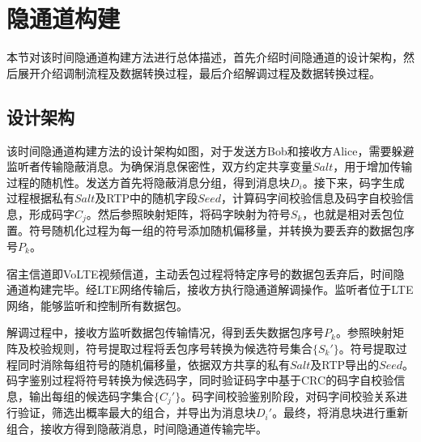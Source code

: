 \section{隐通道构建}
\label{chap:hash:designation}

本节对该时间隐通道构建方法进行总体描述，首先介绍时间隐通道的设计架构，然后展开介绍调制流程及数据转换过程，最后介绍解调过程及数据转换过程。

\subsection{设计架构}
\label{chap:hash:designation:model}


该时间隐通道构建方法的设计架构如图，对于发送方Bob和接收方Alice，需要躲避监听者传输隐蔽消息。为确保消息保密性，双方约定共享变量$Salt$，用于增加传输过程的随机性。发送方首先将隐蔽消息分组，得到消息块$D_{i}$。接下来，码字生成过程根据私有$Salt$及RTP中的随机字段$Seed$，计算码字间校验信息及码字自校验信息，形成码字$C_{j}$。然后参照映射矩阵，将码字映射为符号$S_{k}$，也就是相对丢包位置。符号随机化过程为每一组的符号添加随机偏移量，并转换为要丢弃的数据包序号$P_{k}$。

宿主信道即VoLTE视频信道，主动丢包过程将特定序号的数据包丢弃后，时间隐通道构建完毕。经LTE网络传输后，接收方执行隐通道解调操作。监听者位于LTE网络，能够监听和控制所有数据包。

解调过程中，接收方监听数据包传输情况，得到丢失数据包序号$P_{k}$。参照映射矩阵及校验规则，符号提取过程将丢包序号转换为候选符号集合$\{S_{k}'\}$。符号提取过程同时消除每组符号的随机偏移量，依据双方共享的私有$Salt$及RTP导出的$Seed$。码字鉴别过程将符号转换为候选码字，同时验证码字中基于CRC的码字自校验信息，输出每组的候选码字集合$\{C_{j}'\}$。码字间校验鉴别阶段，对码字间校验关系进行验证，筛选出概率最大的组合，并导出为消息块$D_{i}'$。最终，将消息块进行重新组合，接收方得到隐蔽消息，时间隐通道传输完毕。

